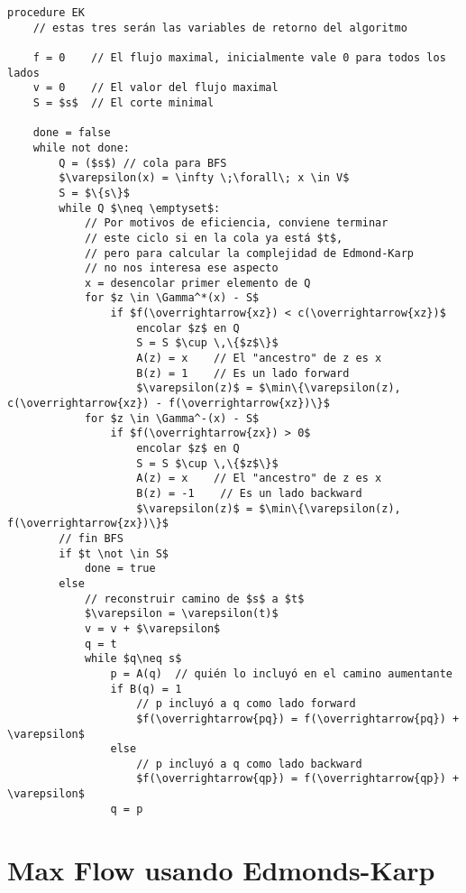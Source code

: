 \documentclass[10pt,a4paper]{article}
\begin{document}
    \begin{lstlisting}[language=pseudo]
procedure EK
    // estas tres serán las variables de retorno del algoritmo

    f = 0    // El flujo maximal, inicialmente vale 0 para todos los lados
    v = 0    // El valor del flujo maximal
    S = $s$  // El corte minimal

    done = false
    while not done:
        Q = ($s$) // cola para BFS
        $\varepsilon(x) = \infty \;\forall\; x \in V$
        S = $\{s\}$
        while Q $\neq \emptyset$:
            // Por motivos de eficiencia, conviene terminar
            // este ciclo si en la cola ya está $t$,
            // pero para calcular la complejidad de Edmond-Karp
            // no nos interesa ese aspecto
            x = desencolar primer elemento de Q
            for $z \in \Gamma^*(x) - S$
                if $f(\overrightarrow{xz}) < c(\overrightarrow{xz})$
                    encolar $z$ en Q
                    S = S $\cup \,\{$z$\}$
                    A(z) = x    // El "ancestro" de z es x
                    B(z) = 1    // Es un lado forward
                    $\varepsilon(z)$ = $\min\{\varepsilon(z), c(\overrightarrow{xz}) - f(\overrightarrow{xz})\}$
            for $z \in \Gamma^-(x) - S$
                if $f(\overrightarrow{zx}) > 0$
                    encolar $z$ en Q
                    S = S $\cup \,\{$z$\}$
                    A(z) = x    // El "ancestro" de z es x
                    B(z) = -1    // Es un lado backward
                    $\varepsilon(z)$ = $\min\{\varepsilon(z), f(\overrightarrow{zx})\}$
        // fin BFS
        if $t \not \in S$
            done = true
        else
            // reconstruir camino de $s$ a $t$
            $\varepsilon = \varepsilon(t)$
            v = v + $\varepsilon$
            q = t
            while $q\neq s$
                p = A(q)  // quién lo incluyó en el camino aumentante
                if B(q) = 1
                    // p incluyó a q como lado forward
                    $f(\overrightarrow{pq}) = f(\overrightarrow{pq}) + \varepsilon$
                else
                    // p incluyó a q como lado backward
                    $f(\overrightarrow{qp}) = f(\overrightarrow{qp}) + \varepsilon$
                q = p
\end{lstlisting}

\section*{Max Flow usando Edmonds-Karp}
\end{document}
